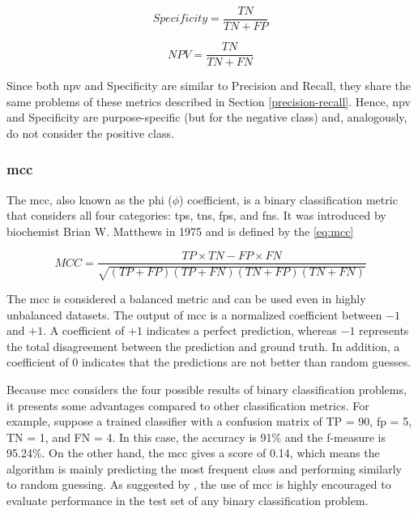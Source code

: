 \begin{equation}
\label{eq:specificity}
Specificity = \frac{TN}{TN + FP}
\end{equation}

\begin{equation}
\label{eq:npv}
NPV = \frac{TN}{TN + FN}
\end{equation}

Since both \acs{npv} and Specificity are similar to Precision and Recall, they share the same problems of these metrics described in Section \ref{precision-recall}. Hence, \acs{npv} and Specificity are purpose-specific (but for the negative class) and, analogously, do not consider the positive class.

\subsubsection{\acl{mcc}} \label{sec:mcc}

The \acf{mcc}, also known as the phi ($\phi$) coefficient, is a binary classification metric that considers all four categories: \aclp{tp}, \aclp{tn}, \aclp{fp}, and \aclp{fn}. It was introduced by biochemist Brian W. Matthews in 1975 \citep{matthews1975comparison} and is defined by the \autoref{eq:mcc}

\begin{equation}
\label{eq:mcc}
MCC = \frac{TP \times TN - FP \times FN}{\sqrt{(TP + FP)(TP + FN)(TN + FP)(TN + FN)}}
\end{equation}

The \acs{mcc} is considered a balanced metric and can be used even in highly unbalanced datasets. The output of \acs{mcc} is a normalized coefficient between $-1$ and $+1$. A coefficient of $+1$ indicates a perfect prediction, whereas $-1$ represents the total disagreement between the prediction and ground truth. In addition, a coefficient of $0$ indicates that the predictions are not better than random guesses. 

Because \acs{mcc} considers the four possible results of binary classification problems, it presents some advantages compared to other classification metrics. For example, suppose a trained classifier with a confusion matrix of TP = 90, \acs{fp} = 5, TN = 1, and FN = 4. In this case, the accuracy is 91\% and the f-measure is 95.24\%. On the other hand, the \acs{mcc} gives a score of 0.14, which means the algorithm is mainly predicting the most frequent class and performing similarly to random guessing. As suggested by \cite{chicco2017ten}, the use of \acs{mcc} is highly encouraged to evaluate performance in the test set of any binary classification problem.


